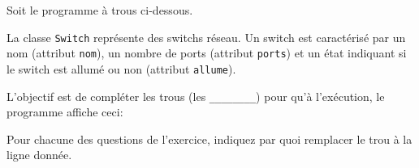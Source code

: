 
Soit le programme à trous ci-dessous.



La classe {\tt Switch} représente des switchs réseau.  Un switch est
caractérisé par un nom (attribut {\tt nom}), un nombre de ports
(attribut {\tt ports}) et un état indiquant si le switch est allumé ou
non (attribut {\tt allume}).

L'objectif est de compléter les trous (les {\tt \_\_\_\_\_\_\_\_})
pour qu'à l'exécution, le programme affiche ceci:


Pour chacune des questions de l'exercice, indiquez par quoi remplacer
le trou à la ligne donnée.
